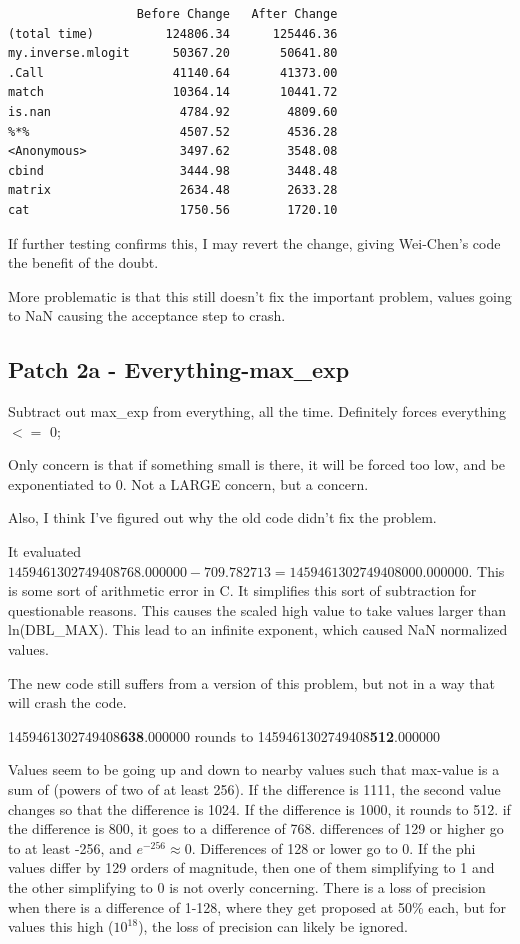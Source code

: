 \begin{verbatim}
                  Before Change   After Change
(total time)          124806.34      125446.36
my.inverse.mlogit      50367.20       50641.80
.Call                  41140.64       41373.00
match                  10364.14       10441.72
is.nan                  4784.92        4809.60
%*%                     4507.52        4536.28
<Anonymous>             3497.62        3548.08
cbind                   3444.98        3448.48
matrix                  2634.48        2633.28
cat                     1750.56        1720.10
\end{verbatim}

If further testing confirms this, I may revert the change, giving Wei-Chen's code the benefit of the doubt.

More problematic is that this still doesn't fix the important problem, values going to NaN causing the acceptance step to crash.


\subsection{Patch 2a - Everything-max\_exp}

Subtract out max\_exp from everything, all the time.
Definitely forces everything $<=$ 0;

Only concern is that if something small is there, it will be forced too low, and be exponentiated to 0. Not a LARGE concern, but a concern.

Also, I think I've figured out why the old code didn't fix the problem.

It evaluated $1459461302749408768.000000 - 709.782713 = 1459461302749408000.000000$. This is some sort of arithmetic error in C. It simplifies this sort of subtraction for questionable reasons. This causes the scaled high value to take values larger than ln(DBL\_MAX). This lead to an infinite exponent, which caused NaN normalized values.

The new code still suffers from a version of this problem, but not in a way that will crash the code. 

1459461302749408\textbf{638}.000000 rounds to
1459461302749408\textbf{512}.000000

Values seem to be going up and down to nearby values such that max-value is a sum of (powers of two of at least 256). If the difference is 1111, the second value changes so that the difference is 1024. If the difference is 1000, it rounds to 512. if the difference is 800, it goes to a difference of 768. differences of 129 or higher go to at least -256, and $e^{-256} \approx 0$. Differences of 128 or lower go to 0.  If the phi values differ by 129 orders of magnitude, then one of them simplifying to 1 and the other simplifying to 0 is not overly concerning. There is a loss of precision when there is a difference of 1-128, where they get proposed at 50\% each, but for values this high ($10^{18}$), the loss of precision can likely be ignored.


